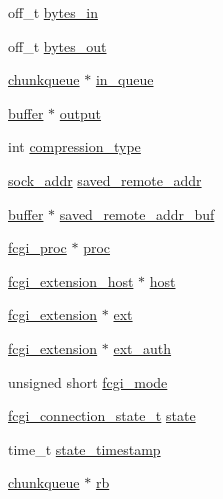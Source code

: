 \begin{DoxyCompactItemize}
\begin{tabbing}
\end{tabbing}\item 
off\-\_\-t \hyperlink{structhandler__ctx_a5f831f4f1bdc46b1e97f2e2f5fcd3c5d}{bytes\-\_\-in}
\item 
off\-\_\-t \hyperlink{structhandler__ctx_a92d3dd181f7fc83cac2a9b83bd1ee9c1}{bytes\-\_\-out}
\item 
\hyperlink{structchunkqueue}{chunkqueue} $\ast$ \hyperlink{structhandler__ctx_ac7647b793ea688f3b3e74a02ba3115fa}{in\-\_\-queue}
\item 
\hyperlink{structbuffer}{buffer} $\ast$ \hyperlink{structhandler__ctx_a5306d846e094dda17cdf4290647a2efb}{output}
\item 
int \hyperlink{structhandler__ctx_a9f007c8662f16f3ca8adda8c95a265ca}{compression\-\_\-type}
\item 
\hyperlink{unionsock__addr}{sock\-\_\-addr} \hyperlink{structhandler__ctx_ac77086e5d028b1f34113b97ef987693b}{saved\-\_\-remote\-\_\-addr}
\item 
\hyperlink{structbuffer}{buffer} $\ast$ \hyperlink{structhandler__ctx_ad7a957e320e60a79d1d4eaebcaa02cd6}{saved\-\_\-remote\-\_\-addr\-\_\-buf}
\item 
\hyperlink{structfcgi__proc}{fcgi\-\_\-proc} $\ast$ \hyperlink{structhandler__ctx_a7f2db1cd3b7b0132c3b8b6a35b27e554}{proc}
\item 
\hyperlink{structfcgi__extension__host}{fcgi\-\_\-extension\-\_\-host} $\ast$ \hyperlink{structhandler__ctx_ab2146df10f86440b0de1b96a1bac6f73}{host}
\item 
\hyperlink{structfcgi__extension}{fcgi\-\_\-extension} $\ast$ \hyperlink{structhandler__ctx_ad4293a11c9be9e5a38980d9fcea1bf67}{ext}
\item 
\hyperlink{structfcgi__extension}{fcgi\-\_\-extension} $\ast$ \hyperlink{structhandler__ctx_a80ea6b7325cdbcf66d2a30035462ea69}{ext\-\_\-auth}
\item 
unsigned short \hyperlink{structhandler__ctx_a6583306740edd409237777ee334275d4}{fcgi\-\_\-mode}
\item 
\hyperlink{mod__fastcgi_8c_ae48bdc9b28eb89e9a2ae3df707989f34}{fcgi\-\_\-connection\-\_\-state\-\_\-t} \hyperlink{structhandler__ctx_a9d4ded0cd96820cde61a4c1fcfeba4b0}{state}
\item 
time\-\_\-t \hyperlink{structhandler__ctx_abc3f39f09ee8ae00d8ca6f2db7efec9c}{state\-\_\-timestamp}
\item 
\hyperlink{structchunkqueue}{chunkqueue} $\ast$ \hyperlink{structhandler__ctx_a99152d50a505bc432273b3edfc6ffd92}{rb}
\item 

\end{DoxyCompactItemize}
